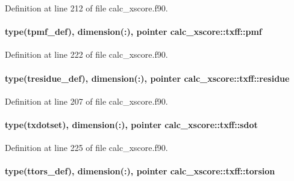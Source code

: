 Definition at line 212 of file calc\-\_\-xscore.\-f90.

\hypertarget{structcalc__xscore_1_1txff_adb8eb69a3fabc7f79348583f9e7d6274}{
\paragraph[{pmf}]{\setlength{\rightskip}{0pt plus 5cm}type({\bf tpmf\-\_\-def}), dimension(\-:), pointer calc\-\_\-xscore\-::txff\-::pmf}}\label{structcalc__xscore_1_1txff_adb8eb69a3fabc7f79348583f9e7d6274}


Definition at line 222 of file calc\-\_\-xscore.\-f90.

\hypertarget{structcalc__xscore_1_1txff_ac2fcc0c3d2f466693f80dcea081002e7}{
\paragraph[{residue}]{\setlength{\rightskip}{0pt plus 5cm}type({\bf tresidue\-\_\-def}), dimension(\-:), pointer calc\-\_\-xscore\-::txff\-::residue}}\label{structcalc__xscore_1_1txff_ac2fcc0c3d2f466693f80dcea081002e7}


Definition at line 207 of file calc\-\_\-xscore.\-f90.

\hypertarget{structcalc__xscore_1_1txff_a271957277a08222d4018553c38a5423a}{
\paragraph[{sdot}]{\setlength{\rightskip}{0pt plus 5cm}type({\bf txdotset}), dimension(\-:), pointer calc\-\_\-xscore\-::txff\-::sdot}}\label{structcalc__xscore_1_1txff_a271957277a08222d4018553c38a5423a}


Definition at line 225 of file calc\-\_\-xscore.\-f90.

\hypertarget{structcalc__xscore_1_1txff_aa46011345d63733f59e6d999c7c9265c}{
\paragraph[{torsion}]{\setlength{\rightskip}{0pt plus 5cm}type({\bf ttors\-\_\-def}), dimension(\-:), pointer calc\-\_\-xscore\-::txff\-::torsion}}\label{structcalc__xscore_1_1txff_aa46011345d63733f59e6d999c7c9265c}


